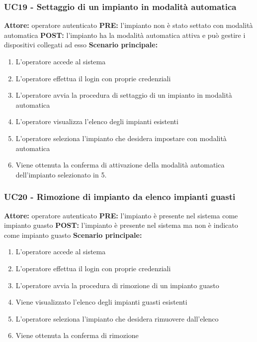 \documentclass[a4paper, 12pt]{article}
\begin{document}
\subsubsection{UC19 - Settaggio di un impianto in modalità automatica}
\textbf{Attore:} operatore autenticato\newline
\textbf{PRE:} l'impianto non è stato settato con modalità automatica\newline
\textbf{POST:} l'impianto ha la modalità automatica attiva e può gestire i dispositivi collegati ad esso\newline
\textbf{Scenario principale:}
\begin{enumerate}
    \item L'operatore accede al sistema
    \item L'operatore effettua il login con proprie credenziali
    \item L'operatore avvia la procedura di settaggio di un impianto in modalità automatica
    \item L'operatore visualizza l'elenco degli impianti esistenti
    \item L'operatore seleziona l'impianto che desidera impostare con modalità automatica
    \item Viene ottenuta la conferma di attivazione della modalità automatica dell'impianto selezionato in 5.
\end{enumerate}

\subsubsection{UC20 - Rimozione di impianto da elenco impianti guasti}
\textbf{Attore:} operatore autenticato\newline
\textbf{PRE:} l'impianto è presente nel sistema come impianto guasto\newline
\textbf{POST:} l'impianto è presente nel sistema ma non è indicato come impianto guasto\newline
\textbf{Scenario principale:}
\begin{enumerate}
    \item L'operatore accede al sistema
    \item L'operatore effettua il login con proprie credenziali
    \item L'operatore avvia la procedura di rimozione di un impianto guasto
    \item Viene visualizzato l'elenco degli impianti guasti esistenti
    \item L'operatore seleziona l'impianto che desidera rimuovere dall'elenco
    \item Viene ottenuta la conferma di rimozione
\end{enumerate}
\end{document}
